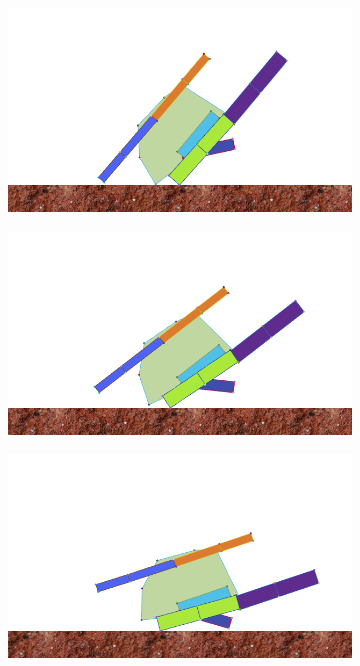 \begin{figure}[H]
        \begin{subfigure}[b]{0.3\textwidth}
          \includegraphics[width=\linewidth,center]{graphics/simulation-discussion/hupf_4}
          \caption{\label{fig:hupf_4}}
        \end{subfigure}
        \hspace{\fill}
        \begin{subfigure}[b]{0.3\textwidth}
          \includegraphics[width=\linewidth,center]{graphics/simulation-discussion/hupf_5}
          \caption{\label{fig:hupf_5}}
        \end{subfigure}
        \hspace{\fill}
        \begin{subfigure}[b]{0.3\textwidth}
          \includegraphics[width=\linewidth,center]{graphics/simulation-discussion/hupf_6}
          \caption{\label{fig:hupf_6}}
        \end{subfigure}


\end{figure}
